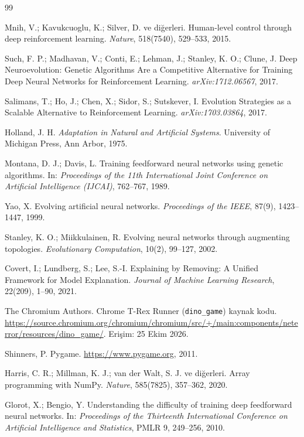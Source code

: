 \documentclass[11pt,a4paper]{article}
\begin{document}
\begin{thebibliography}{99}

Mnih, V.; Kavukcuoglu, K.; Silver, D. ve diğerleri. Human-level control through deep reinforcement learning. \textit{Nature}, 518(7540), 529--533, 2015.

Such, F. P.; Madhavan, V.; Conti, E.; Lehman, J.; Stanley, K. O.; Clune, J. Deep Neuroevolution: Genetic Algorithms Are a Competitive Alternative for Training Deep Neural Networks for Reinforcement Learning. \textit{arXiv:1712.06567}, 2017.

Salimans, T.; Ho, J.; Chen, X.; Sidor, S.; Sutskever, I. Evolution Strategies as a Scalable Alternative to Reinforcement Learning. \textit{arXiv:1703.03864}, 2017.

Holland, J. H. \textit{Adaptation in Natural and Artificial Systems}. University of Michigan Press, Ann Arbor, 1975.

Montana, D. J.; Davis, L. Training feedforward neural networks using genetic algorithms. In: \textit{Proceedings of the 11th International Joint Conference on Artificial Intelligence (IJCAI)}, 762--767, 1989.

Yao, X. Evolving artificial neural networks. \textit{Proceedings of the IEEE}, 87(9), 1423--1447, 1999.

Stanley, K. O.; Miikkulainen, R. Evolving neural networks through augmenting topologies. \textit{Evolutionary Computation}, 10(2), 99--127, 2002.

Covert, I.; Lundberg, S.; Lee, S.-I. Explaining by Removing: A Unified Framework for Model Explanation. \textit{Journal of Machine Learning Research}, 22(209), 1--90, 2021.

The Chromium Authors. Chrome T-Rex Runner (\texttt{dino\_game}) kaynak kodu. \url{https://source.chromium.org/chromium/chromium/src/+/main:components/neterror/resources/dino_game/}. Erişim: 25 Ekim 2026.

Shinners, P. Pygame. \url{https://www.pygame.org}, 2011.

Harris, C. R.; Millman, K. J.; van der Walt, S. J. ve diğerleri. Array programming with NumPy. \textit{Nature}, 585(7825), 357--362, 2020.

Glorot, X.; Bengio, Y. Understanding the difficulty of training deep feedforward neural networks. In: \textit{Proceedings of the Thirteenth International Conference on Artificial Intelligence and Statistics}, PMLR 9, 249--256, 2010.


\end{thebibliography}
\end{document}
